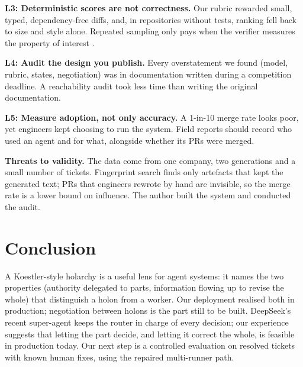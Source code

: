 \documentclass[conference]{IEEEtran}
\begin{document}
\textbf{L3: Deterministic scores are not correctness.} Our rubric rewarded
small, typed, dependency-free diffs, and, in repositories without tests,
ranking fell back to size and style alone. Repeated sampling only pays when
the verifier measures the property of interest
\cite{brown2024monkeys,chen2023codet}.

\textbf{L4: Audit the design you publish.} Every overstatement we found
(model, rubric, states, negotiation) was in documentation written during a
competition deadline. A reachability audit took less time than writing the
original documentation.

\textbf{L5: Measure adoption, not only accuracy.} A 1-in-10 merge rate looks
poor, yet engineers kept choosing to run the system. Field reports should
record who used an agent and for what, alongside whether its PRs were
merged.

\textbf{Threats to validity.} The data come from one company, two
generations and a small number of tickets. Fingerprint search finds only
artefacts that kept the generated text; PRs that engineers rewrote by hand
are invisible, so the merge rate is a lower bound on influence. The author
built the system and conducted the audit.

\section{Conclusion}

A Koestler-style holarchy is a useful lens for agent systems: it names the
two properties (authority delegated to parts, information flowing up to
revise the whole) that distinguish a holon from a worker. Our deployment
realised both in production; negotiation between holons is the part still
to be built.
DeepSeek's recent super-agent \cite{deepseek2026superagent} keeps the router
in charge of every decision; our experience suggests that letting the part
decide, and letting it correct the whole, is feasible in production today.
Our next step is a controlled evaluation on resolved tickets with known
human fixes, using the repaired multi-runner path.



\end{document}
